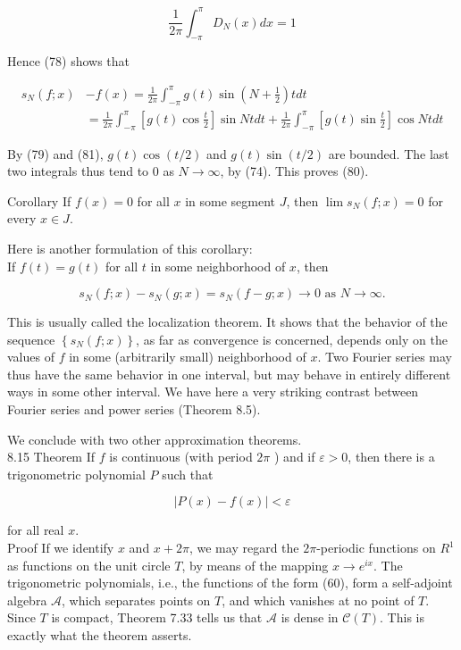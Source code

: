 \documentclass[10pt]{article}
\begin{document}
$$
\frac{1}{2 \pi} \int_{-\pi}^{\pi} D_{N}(x) d x=1
$$

Hence (78) shows that

$$
\begin{aligned}
s_{N}(f ; x) & -f(x)=\frac{1}{2 \pi} \int_{-\pi}^{\pi} g(t) \sin \left(N+\frac{1}{2}\right) t d t \\
& =\frac{1}{2 \pi} \int_{-\pi}^{\pi}\left[g(t) \cos \frac{t}{2}\right] \sin N t d t+\frac{1}{2 \pi} \int_{-\pi}^{\pi}\left[g(t) \sin \frac{t}{2}\right] \cos N t d t
\end{aligned}
$$

By (79) and (81), $g(t) \cos (t / 2)$ and $g(t) \sin (t / 2)$ are bounded. The last two integrals thus tend to 0 as $N \rightarrow \infty$, by (74). This proves (80).

Corollary If $f(x)=0$ for all $x$ in some segment $J$, then $\lim s_{N}(f ; x)=0$ for every $x \in J$.

Here is another formulation of this corollary:\\
If $f(t)=g(t)$ for all $t$ in some neighborhood of $x$, then

$$
s_{N}(f ; x)-s_{N}(g ; x)=s_{N}(f-g ; x) \rightarrow 0 \text { as } N \rightarrow \infty .
$$

This is usually called the localization theorem. It shows that the behavior of the sequence $\left\{s_{N}(f ; x)\right\}$, as far as convergence is concerned, depends only on the values of $f$ in some (arbitrarily small) neighborhood of $x$. Two Fourier series may thus have the same behavior in one interval, but may behave in entirely different ways in some other interval. We have here a very striking contrast between Fourier series and power series (Theorem 8.5).

We conclude with two other approximation theorems.\\
8.15 Theorem If $f$ is continuous (with period $2 \pi$ ) and if $\varepsilon>0$, then there is a trigonometric polynomial $P$ such that

$$
|P(x)-f(x)|<\varepsilon
$$

for all real $x$.\\
Proof If we identify $x$ and $x+2 \pi$, we may regard the $2 \pi$-periodic functions on $R^{1}$ as functions on the unit circle $T$, by means of the mapping $x \rightarrow e^{i x}$. The trigonometric polynomials, i.e., the functions of the form (60), form a self-adjoint algebra $\mathscr{A}$, which separates points on $T$, and which vanishes at no point of $T$. Since $T$ is compact, Theorem 7.33 tells us that $\mathscr{A}$ is dense in $\mathscr{C}(T)$. This is exactly what the theorem asserts.
\end{document}
